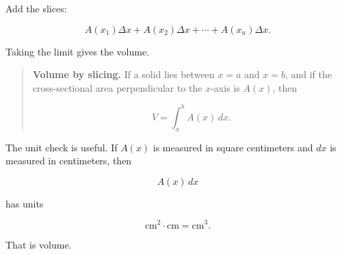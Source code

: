 Add the slices:

\[
A(x_1)\Delta x+A(x_2)\Delta x+\cdots+A(x_n)\Delta x.
\]

Taking the limit gives the volume.

\begin{quote}
\textbf{Volume by slicing.}
If a solid lies between \(x=a\) and \(x=b\), and if the cross-sectional area perpendicular
to the \(x\)-axis is \(A(x)\), then

\[
\boxed{
V=\int_a^b A(x)\,dx.
}
\]
\end{quote}

The unit check is useful.  If \(A(x)\) is measured in square centimeters and \(dx\) is
measured in centimeters, then

\[
A(x)\,dx
\]

has units

\[
\text{cm}^2\cdot\text{cm}=\text{cm}^3.
\]

That is volume.

